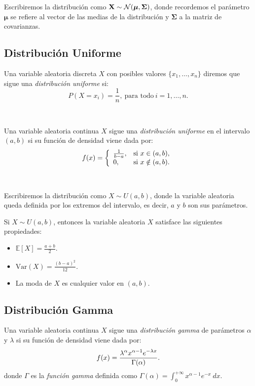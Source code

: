 \documentclass[oneside,openright,titlepage,numbers=noenddot,openany,headinclude,footinclude=true,
cleardoublepage=empty,abstractoff,BCOR=5mm,paper=a4,fontsize=12pt,main=spanish]{scrreprt}
\begin{document}
Escribiremos la distribución como $\textbf{X} \sim \mathcal{N}(\bm{\mu}, \bm{\Sigma})$, donde recordemos el parámetro $\bm{\mu}$ se refiere al vector de las medias de la distribución y $\bm{\Sigma}$ a la matriz de covarianzas.

\subsection*{Distribución Uniforme}

\begin{definition}
Una variable aleatoria discreta $X$ con posibles valores $\{x_1,\dots,x_n\}$ diremos que sigue una \textit{distribución uniforme} si: $$P(X=x_i)=\frac{1}{n}, \ \text{para todo} \ i=1,\dots,n.$$
\end{definition}\

\begin{definition}
Una variable aleatoria continua $X$ sigue una \textit{distribución uniforme} en el intervalo $(a,b)$ si su función de densidad viene dada por: $$f(x)=\left \{
\begin{array}{l l}
\frac{1}{b-a}, & \mbox{si } x \in (a,b), \\
0, & \mbox{si } x \notin (a,b).
\end{array}
\right.$$
\end{definition}\

Escribiremos la distribución como $X \sim U(a,b)$, donde la variable aleatoria queda definida por los extremos del intervalo, es decir, $a$ y $b$ son sus parámetros.\\

\begin{proposition}[Propiedades]
Si $X \sim U(a,b)$, entonces la variable aleatoria $X$ satisface las siguientes propiedades:
\begin{itemize}
    \item $\mathbb{E}[X]=\frac{a+b}{2}$.
    \item $\text{Var}(X)=\frac{(b-a)^2}{12}$.
    \item La moda de $X$ es cualquier valor en $(a,b)$.
\end{itemize}
\end{proposition}


\subsection*{Distribución Gamma}

\begin{definition}
Una variable aleatoria continua $X$ sigue una \textit{distribución gamma} de parámetros $\alpha$ y $\lambda$ si su función de densidad viene dada por: $$f(x)=\frac{\displaystyle \lambda^{\alpha}x^{\alpha-1}e^{-\lambda x}}{\displaystyle \Gamma(\alpha)}.$$
donde $\Gamma$ es la \textit{función gamma} definida como $\Gamma(\alpha)=\displaystyle \int_0^{+\infty}x^{\alpha-1}e^{-x} \ dx$.
\end{definition}\
\end{document}
